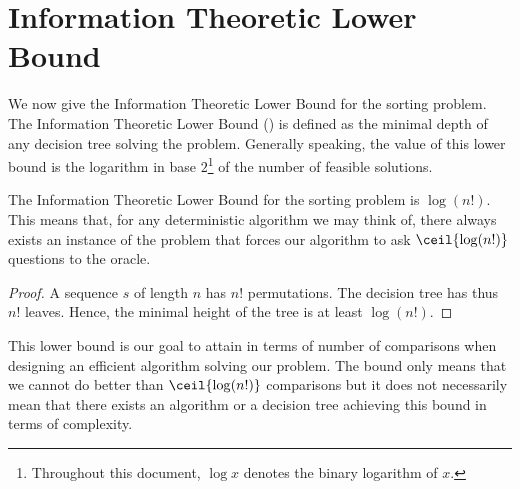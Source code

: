 \section{Information Theoretic Lower Bound}
\label{tree:sorting:ITLB}

We now give the Information Theoretic Lower Bound for the sorting problem. The
Information Theoretic Lower Bound () is defined as the minimal depth of any
decision tree solving the problem. Generally speaking, the value of this lower
bound is the logarithm in base \(2\)\footnote{Throughout this document, \(\log x\) denotes the binary logarithm of \(x\).}
of the number of feasible solutions.

\begin{theorem}
The Information Theoretic Lower Bound for the sorting problem is
\(\log(n!)\). This means that, for any deterministic algorithm we may think of,
there always exists an instance of the problem that forces our
algorithm to ask \(\ceil{\log(n!)}\) questions to the oracle.
\end{theorem}

\begin{proof}
A sequence \(s\) of length \(n\) has \(n!\) permutations. The decision tree has thus
\(n!\) leaves. Hence, the minimal height of the tree is at least \(\log(n!)\).
\end{proof}

This lower bound is our goal to attain in terms of number of comparisons
when designing an efficient algorithm solving our problem. The bound only means
that we cannot do better than \(\ceil{\log(n!)}\) comparisons but it does not
necessarily mean that there exists an algorithm or a decision tree achieving
this bound in terms of complexity.
